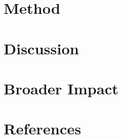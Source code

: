 \documentclass{article}
\begin{document}
\section{Method}

\section{Discussion}

\section*{Broader Impact}

\section*{References}

{}

\end{document}

